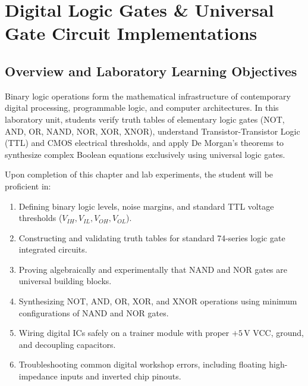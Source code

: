 \chapter{Digital Logic Gates \& Universal Gate Circuit Implementations}
\label{chap:logic-gates}

\section{Overview and Laboratory Learning Objectives}
Binary logic operations form the mathematical infrastructure of contemporary digital processing, programmable logic, and computer architectures. In this laboratory unit, students verify truth tables of elementary logic gates (NOT, AND, OR, NAND, NOR, XOR, XNOR), understand Transistor-Transistor Logic (TTL) and CMOS electrical thresholds, and apply De Morgan's theorems to synthesize complex Boolean equations exclusively using universal logic gates.

\begin{important}
Upon completion of this chapter and lab experiments, the student will be proficient in:
\begin{enumerate}[leftmargin=1.5em]
    \item Defining binary logic levels, noise margins, and standard TTL voltage thresholds ($V_{IH}, V_{IL}, V_{OH}, V_{OL}$).
    \item Constructing and validating truth tables for standard 74-series logic gate integrated circuits.
    \item Proving algebraically and experimentally that NAND and NOR gates are universal building blocks.
    \item Synthesizing NOT, AND, OR, XOR, and XNOR operations using minimum configurations of NAND and NOR gates.
    \item Wiring digital ICs safely on a trainer module with proper $+5\,\mathrm{V}$ VCC, ground, and decoupling capacitors.
    \item Troubleshooting common digital workshop errors, including floating high-impedance inputs and inverted chip pinouts.
\end{enumerate}
\end{important}

